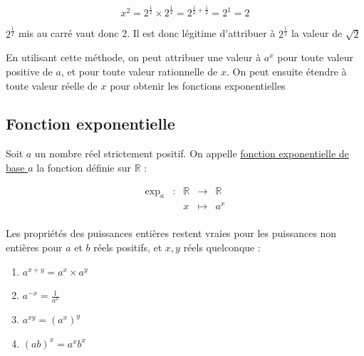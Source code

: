 \documentclass[10pt,a4paper]{book}
\newcommand{\R}{\mathbb{R}}
\begin{document}
\[ x^2 = 2^{\frac{1}{2}} \times 2^{\frac{1}{2}} = 2^{\frac{1}{2} + \frac{1}{2}} = 2^1 = 2\]

$2^{\frac{1}{2}}$ mis au carré vaut donc 2.  Il est donc légitime d'attribuer à $2^{\frac{1}{2}}$ la valeur de $\sqrt{2}$

En utilisant cette méthode, on peut attribuer une valeur à $a^x$ pour toute valeur positive de $a$, et pour toute valeur rationnelle de $x$. On peut ensuite étendre à toute valeur réelle de $x$ pour obtenir les fonctions exponentielles

\subsection{Fonction exponentielle}

\begin{de}
    Soit $a$ un nombre réel strictement positif. On appelle \underline{fonction exponentielle de base $a$} la fonction définie sur $\R$ :

    \[ \begin{array}{ccccc}
        \text{exp}_a & : & \R & \to & \R \\
         & & x & \mapsto & a^x \\
        \end{array}\]
\end{de}


\begin{prop}
    Les propriétés des puissances entières restent vraies pour les puissances non entières pour $a$ et $b$ réels positifs,  et $x,y$ réels quelconque : 
    \begin{multicols}{2}
        \begin{enumerate}
            \item $a^{x+y} = a^x \times a^y$
            \item $a^{-x} = \frac{1}{a^x}$
            \item $a^{xy} = (a^{x})^y$
            \item $(ab)^{x} = a^{x}b^x$
        \end{enumerate}
    \end{multicols}
\end{prop}
\end{document}
